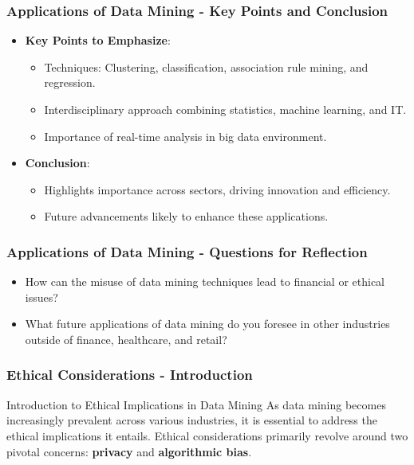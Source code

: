 \documentclass[aspectratio=169]{beamer}
\begin{document}
\begin{frame}[fragile]
    \frametitle{Applications of Data Mining - Key Points and Conclusion}
    \begin{itemize}
        \item \textbf{Key Points to Emphasize}:
        \begin{itemize}
            \item Techniques: Clustering, classification, association rule mining, and regression.
            \item Interdisciplinary approach combining statistics, machine learning, and IT.
            \item Importance of real-time analysis in big data environment.
        \end{itemize}
        \item \textbf{Conclusion}:
        \begin{itemize}
            \item Highlights importance across sectors, driving innovation and efficiency.
            \item Future advancements likely to enhance these applications.
        \end{itemize}
    \end{itemize}
\end{frame}

\begin{frame}[fragile]
    \frametitle{Applications of Data Mining - Questions for Reflection}
    \begin{itemize}
        \item How can the misuse of data mining techniques lead to financial or ethical issues?
        \item What future applications of data mining do you foresee in other industries outside of finance, healthcare, and retail?
    \end{itemize}
\end{frame}

\begin{frame}[fragile]
    \frametitle{Ethical Considerations - Introduction}
    \begin{block}{Introduction to Ethical Implications in Data Mining}
        As data mining becomes increasingly prevalent across various industries, it is essential to address the ethical implications it entails. Ethical considerations primarily revolve around two pivotal concerns: \textbf{privacy} and \textbf{algorithmic bias}.
    \end{block}
\end{frame}
\end{document}

